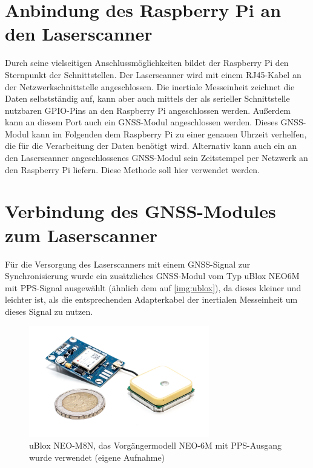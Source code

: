\documentclass[a4paper,12pt,bibliography=totoc, listof=totoc,titlepage,pointlessnumbers]{scrreprt}
\begin{document}
\section{Anbindung des Raspberry Pi an den Laser\-scan\-ner}
Durch seine vielseitigen Anschlussmöglichkeiten bildet der Raspberry Pi den Sternpunkt der Schnittstellen. Der Laser\-scan\-ner wird mit einem RJ45-Kabel an der Netzwerkschnittstelle angeschlossen. Die inertiale Messeinheit zeichnet die Daten selbst\-stän\-dig auf, kann aber auch mittels der als serieller Schnittstelle nutzbaren GPIO-Pins an den Raspberry Pi angeschlossen werden. Außerdem kann an diesem Port auch ein GNSS-Modul angeschlossen werden. Dieses GNSS-Modul kann im Folgenden dem Raspberry Pi zu einer genauen Uhrzeit verhelfen, die für die Verarbeitung der Daten benötigt wird. Alternativ kann auch ein an den Laser\-scan\-ner angeschlossenes GNSS-Modul sein Zeitstempel per Netzwerk an den Raspberry Pi liefern. Diese Methode soll hier verwendet werden.

\section{Verbindung des GNSS-Modules zum Laser\-scan\-ner}
\label{s:GNSSAnschluss}
Für die Versorgung des Laser\-scan\-ners mit einem GNSS-Signal zur Synchronisierung wurde ein zusätzliches GNSS-Modul vom Typ uBlox NEO6M mit PPS-Signal ausgewählt (ähnlich dem auf \autoref{img:ublox}), da dieses kleiner und leichter ist, als die entsprechenden Adapterkabel der inertialen Messeinheit um dieses Signal zu nutzen.

\begin{figure}
 \centering
 \includegraphics[width=0.7\textwidth]{./img/ublox.jpg}
 \caption{uBlox NEO-M8N, das Vorgängermodell NEO-6M mit PPS-Ausgang wurde verwendet (eigene Aufnahme)}
 \label{img:ublox}
\end{figure}
\end{document}
